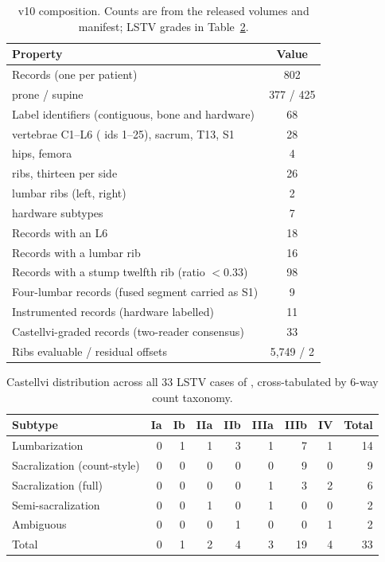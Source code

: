 \begin{table}[t]
\caption{\dataset{} v10 composition. Counts are from the
released volumes and manifest; LSTV grades in
Table~\ref{tab:castellvi_dist}.}
\label{tab:scan_stats}
\centering
\small
\begin{tabular}{lc}
\toprule
\bfseries Property & \bfseries Value \\
\midrule
Records (one per patient)                         & 802 \\
\quad prone / supine                              & 377 / 425 \\
Label identifiers (contiguous, bone and hardware) & 68 \\
\quad vertebrae C1--L6 (\VerSe{} ids 1--25), sacrum, T13, S1 & 28 \\
\quad hips, femora                                & 4 \\
\quad ribs, thirteen per side                     & 26 \\
\quad lumbar ribs (left, right)                   & 2 \\
\quad hardware subtypes                           & 7 \\
Records with an L6                                & 18 \\
Records with a lumbar rib                         & 16 \\
Records with a stump twelfth rib (ratio $<0.33$)  & 98 \\
Four-lumbar records (fused segment carried as S1) & 9 \\
Instrumented records (hardware labelled)          & 11 \\
Castellvi-graded records (two-reader consensus)   & 33 \\
Ribs evaluable / residual offsets                 & 5{,}749 / 2 \\
\bottomrule
\end{tabular}
\end{table}

\begin{table}[h]
\caption{Castellvi distribution across all 33 LSTV cases
of \dataset{}, cross-tabulated by 6-way count taxonomy.}
\label{tab:castellvi_dist}
\centering
\small
\setlength{\tabcolsep}{4pt}
\begin{tabular}{lrrrrrrrr}
\toprule
\bfseries Subtype & \bfseries Ia & \bfseries Ib & \bfseries IIa & \bfseries IIb & \bfseries IIIa & \bfseries IIIb & \bfseries IV & \bfseries Total \\
\midrule
Lumbarization                  & 0 & 1 & 1 & 3 & 1 & 7 & 1 & 14 \\
Sacralization (count-style)    & 0 & 0 & 0 & 0 & 0 & 9 & 0 & 9 \\
Sacralization (full)           & 0 & 0 & 0 & 0 & 1 & 3 & 2 & 6 \\
Semi-sacralization             & 0 & 0 & 1 & 0 & 1 & 0 & 0 & 2 \\
Ambiguous                      & 0 & 0 & 0 & 1 & 0 & 0 & 1 & 2 \\
\midrule
Total                          & 0 & 1 & 2 & 4 & 3 & 19 & 4 & 33 \\
\bottomrule
\end{tabular}
\end{table}
